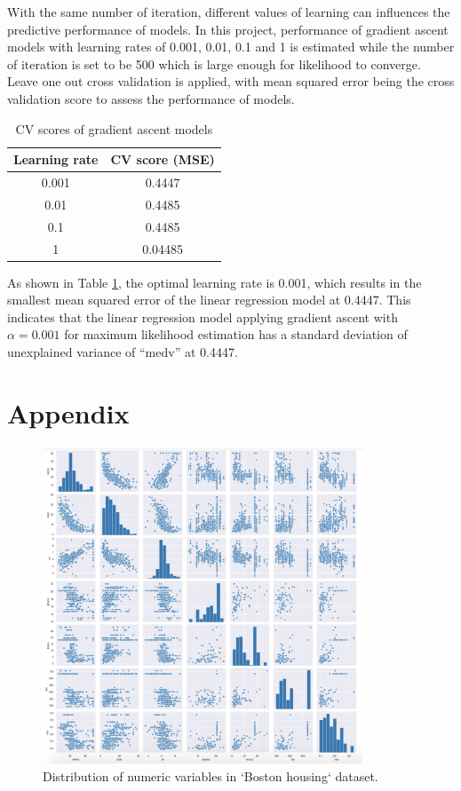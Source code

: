 \documentclass[letterpaper,12pt,twoside,]{pinp}
\begin{document}
With the same number of iteration, different values of learning can
influences the predictive performance of models. In this project,
performance of gradient ascent models with learning rates of 0.001,
0.01, 0.1 and 1 is estimated while the number of iteration is set to be
500 which is large enough for likelihood to converge. Leave one out
cross validation is applied, with mean squared error being the cross
validation score to assess the performance of models.

\begin{table}
\begin{tabular}{ |c|c| } 
\hline
\textbf{Learning rate} & \textbf{CV score (MSE)} \\
\hline
0.001 & 0.4447 \\
0.01 & 0.4485 \\
0.1 & 0.4485 \\
1 & 0.04485 \\
\hline
\end{tabular}
\centering
\caption{CV scores of gradient ascent models}
\label{table:cvScore}
\end{table}

As shown in Table \ref{table:cvScore}, the optimal learning rate is
0.001, which results in the smallest mean squared error of the linear
regression model at 0.4447. This indicates that the linear regression
model applying gradient ascent with \(\alpha=0.001\) for maximum
likelihood estimation has a standard deviation of unexplained variance
of ``medv'' at 0.4447.

\hypertarget{appendix-1}{%
\section{Appendix}\label{appendix-1}}

\begin{figure}[h]
\includegraphics[width=0.85\textwidth]{houseScatter.png}
\centering
\caption{Distribution of numeric variables in `Boston housing` dataset.}
\label{fig:houseScatter}
\end{figure}
\end{document}
